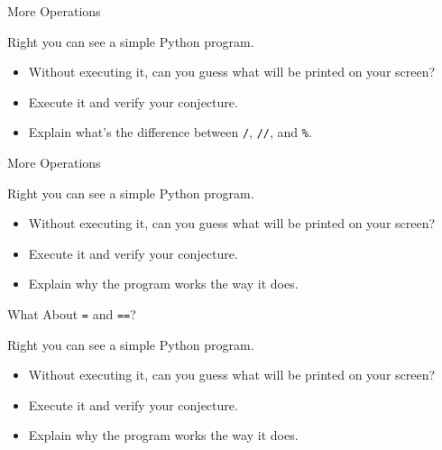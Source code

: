 \documentclass[aspectratio=169, 12pt, xcolor=table]{beamer}
\begin{document}
	\begin{frame}{More Operations}
		\begin{minipage}[t]{0.5\textwidth}
			\vspace{0pt}
			Right you can see a simple Python program.
			\begin{itemize}
				\item Without executing it, can you guess what will be printed on your screen?
				\item Execute it and verify your conjecture.
				\item Explain what's the difference between \texttt{/}, \texttt{//}, and \texttt{\%}.
			\end{itemize}
		\end{minipage}\hfill
		\begin{minipage}[t]{.45\textwidth}
			\vspace{0pt}
			\centering
			
		\end{minipage}	
	\end{frame}

	\begin{frame}{More Operations}
		\begin{minipage}[t]{0.5\textwidth}
			\vspace{0pt}
			Right you can see a simple Python program.
			\begin{itemize}
				\item Without executing it, can you guess what will be printed on your screen?
				\item Execute it and verify your conjecture.
				\item Explain why the program works the way it does.
			\end{itemize}
		\end{minipage}\hfill
		\begin{minipage}[t]{.45\textwidth}
			\vspace{0pt}
			\centering
			
		\end{minipage}	
	\end{frame}

	\begin{frame}{What About \texttt{=} and \texttt{==}?}
		\begin{minipage}[t]{0.5\textwidth}
			\vspace{0pt}
			Right you can see a simple Python program.
			\begin{itemize}
				\item Without executing it, can you guess what will be printed on your screen?
				\item Execute it and verify your conjecture.
				\item Explain why the program works the way it does.
			\end{itemize}
		\end{minipage}\hfill
		\begin{minipage}[t]{.45\textwidth}
			\vspace{0pt}
			\centering
			
		\end{minipage}	
	\end{frame}
\end{document}
